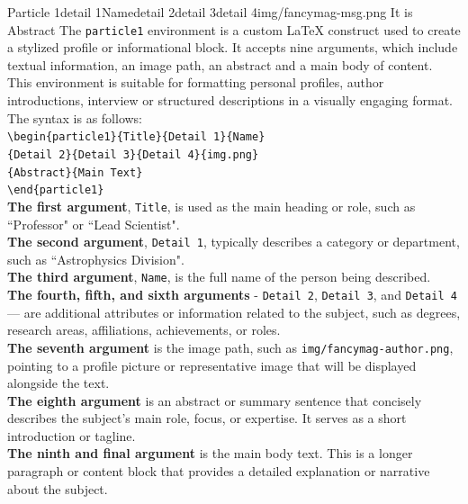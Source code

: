 \documentclass[10pt,twoside]{article}
\begin{document}
{  	\begin{particle1}{Particle 1}{detail 1}{Name}{detail 2}{detail 3}{detail 4}{img/fancymag-msg.png}
  	{It is Abstract}  	
  	{\lettrine{T}{}he \texttt{particle1} environment is a custom LaTeX construct used to create a stylized profile or informational block. It accepts nine arguments, which include textual information, an image path, an abstract and a main body of content. This environment is suitable for formatting personal profiles, author introductions, interview or structured descriptions in a visually engaging format.\\
  	The syntax is as follows:\\
  	\texttt{\textbackslash begin\{particle1\}\{Title\}\{Detail 1\}\{Name\}\\\{Detail 2\}\{Detail 3\}\{Detail 4\}\{img.png\}\\\{Abstract\}\{Main Text\}\\\textbackslash end\{particle1\}}\\
  	\bullet \textbf{The first argument}, \texttt{Title}, is used as the main heading or role, such as ``Professor" or ``Lead Scientist".\\
  	\bullet \textbf{The second argument}, \texttt{Detail 1}, typically describes a category or department, such as ``Astrophysics Division".\\
  	\bullet \textbf{The third argument}, \texttt{Name}, is the full name of the person being described.\\  	
  	\bullet \textbf{ The fourth, fifth, and sixth arguments} - \texttt{Detail 2}, \texttt{Detail 3}, and \texttt{Detail 4} — are additional attributes or information related to the subject, such as degrees, research areas, affiliations, achievements, or roles.\\  	
  	\bullet \textbf{The seventh argument} is the image path, such as \texttt{img/fancymag-author.png}, pointing to a profile picture or representative image that will be displayed alongside the text.\\  	
  	\bullet \textbf{The eighth argument} is an abstract or summary sentence that concisely describes the subject's main role, focus, or expertise. It serves as a short introduction or tagline.\\  	
  	\bullet \textbf{The ninth and final argument} is the main body text. This is a longer paragraph or content block that provides a detailed explanation or narrative about the subject.}  		
  	\end{particle1}
  	
}
\end{document}
